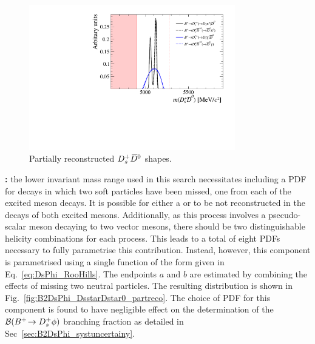 \begin{figure}[!h]
    \centering
    \includegraphics[width=0.80\textwidth]{figs/B2DsPhi/DsD0_part_reco_Shapes.pdf}
    \caption{Partially reconstructed ${{D}^+_{s}}{{\kern 0.2em\overline{\kern -0.2em D}{}}{}^0}$ shapes.}
    \label{fig:B2DsPhi_DsD0_partreco}   
\end{figure}


\begin{description}

\item \textbf{\decay{\Bp}{\Dssp\Dstarzb}:} the lower invariant mass range used in this search necessitates including a PDF for \decay{\Bp}{\Dssp\Dstarzb} decays in which two soft particles have been missed, one from each of the excited \D meson decays. It is possible for either a \piz or \Pgamma to be not reconstructed in the decays of both excited \D mesons. Additionally, as this process involves a psecudo-scalar meson decaying to two vector mesons, there should be two distinguishable helicity combinations for each process. This leads to a total of eight PDFs necessary to fully parametrise this contribution. Instead, however, this component is parametrised using a single function of the form given in Eq.~\ref{eq:DsPhi_RooHills}. The endpoints $a$ and $b$ are estimated by combining the effects of missing two neutral particles. The resulting distribution is shown in Fig.~\ref{fig:B2DsPhi_DsstarDstar0_partreco}.
The choice of PDF for this component is found to have negligible effect on the determination of the ${\mathcal{B}}({{{B}^+}}\!\rightarrow {\ensuremath{{D}^+_{s}}}\phi)$ branching fraction as detailed in Sec~\ref{sec:B2DsPhi_systuncertainy}.

\end{description}

